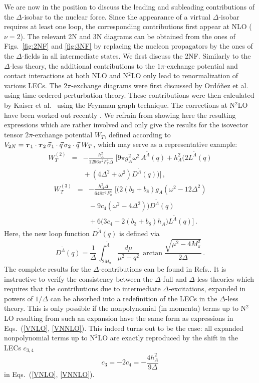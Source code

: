 \documentclass[aps,rmp,nofootinbib,twocolumn,floatfix]{revtex4}
\newcommand{\beq}{\begin{equation}}
\newcommand{\eeq}{\end{equation}}
\newcommand{\beqa}{\begin{eqnarray}}
\newcommand{\eeqa}{\end{eqnarray}}
\newcommand{\fet}[1]{\mbox{\boldmath $#1$}}
\newcommand{\nn}{\nonumber \\ }
\begin{document}
We are now in the position to discuss the leading and subleading contributions
of the $\Delta$-isobar to the nuclear force. Since the appearance of a virtual
$\Delta$-isobar requires at least one loop, the corresponding contributions
first appear at NLO ($\nu = 2$). The relevant 2N and 3N diagrams can be
obtained from the ones of Figs.~\ref{fig:2NF} and \ref{fig:3NF} by replacing the nucleon
propagators by the ones of the $\Delta$-fields in all intermediate
states. We first discuss the 2NF. Similarly to the $\Delta$-less theory, the
additional contributions to 
the $1\pi$-exchange potential and contact interactions at both NLO and N$^2$LO
only lead to renormalization of various LECs. The $2\pi$-exchange diagrams were first 
discussed by Ord\'o\~nez et 
al.~\cite{Ordonez:1995rz} using time-ordered 
perturbation theory. These contributions were then calculated by Kaiser 
et al.~\cite{Kaiser:1998wa} using the Feynman graph technique. The corrections
at N$^2$LO have been worked out recently \cite{Krebs:2007rh}. We refrain
from showing here the resulting expressions which are rather involved and only
give the results for  the isovector 
tensor $2\pi$-exchange potential $W_T$, defined according to $V_{2N} = \fet \tau_1 \cdot \fet \tau_2 \, \vec \sigma_1 \cdot \vec q \, 
\sigma_2 \cdot \vec q \; W_T$, which may serve as a representative example: 
\begin{eqnarray}
W_T^{(2)} &=&  -\frac{h_A^2}{1296 \pi^2 F_\pi^4 \Delta }\;   
\Big[ 9 \pi g_A^2 \omega^2 \, A^{\tilde \Lambda}(q) + h_A^2 \big(
2L^{\tilde \Lambda}(q) \nn
&& {} + (4 \Delta^2 + \omega^2 ) D^{\tilde \Lambda}(q) \big)
\Big] \,, \nonumber
\eeqa
\beqa
W_T^{(3)} &=&  -\frac{h_A^2 \Delta}{648 \pi^2 F_\pi^4 }\;
\Big[ \big( 2 (b_3 + b_8) g_A (\omega^2 - 12 \Delta^2 ) \nn
&& {} - 9 c_4 (\omega^2 - 4
\Delta^2) \big) D^{\tilde \Lambda} (q)  \nn
&& {}+ 6 \big( 3 c_4 - 2 (b_3 + b_8) h_A \big)
L^{\tilde \Lambda} (q) \Big]\,.
\end{eqnarray}
Here, the new loop function $D^{\tilde \Lambda} (q)$ is defined via  
\begin{equation}
D^{\tilde \Lambda}(q) = \frac{1}{\Delta} \, \int_{2M_\pi}^{\tilde \Lambda}
\frac{d\mu}{\mu^2+q^2} \, \arctan \frac{\sqrt{\mu^2-4M_\pi^2}}{2\Delta}\,.
\end{equation}
The complete results for the $\Delta$-contributions can be found in
Refs.\cite{Kaiser:1998wa,Krebs:2007rh}. 
It is instructive  to verify the consistency between the $\Delta$-full and
$\Delta$-less theories which requires that the contributions due to intermediate
$\Delta$-excitations, expanded in powers of $1/\Delta$ can be absorbed
into a redefinition of the LECs in the $\Delta$-less theory. This is only
possible if the nonpolynomial (in momenta) terms up to N$^2$LO resulting from 
such an expansion have the same form as expressions in Eqs.~(\ref{VNLO},
\ref{VNNLO}). This indeed turns out to be the case: all expanded
nonpolynomial terms up to N$^2$LO are exactly reproduced by the shift in the
LECs $c_{3,4}$
\beq
\label{saturation}
c_3 = - 2 c_4 = -\frac{4 h_A^2}{9 \Delta }
\eeq 
in Eqs.~(\ref{VNLO}, \ref{VNNLO}). 
\end{document}
